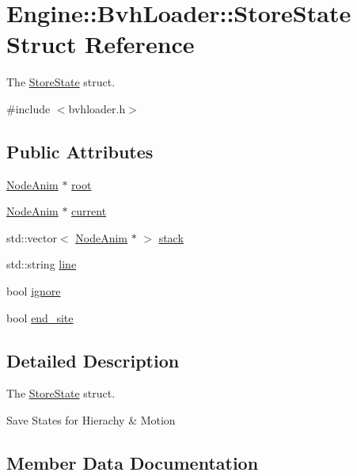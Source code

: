 \hypertarget{structEngine_1_1BvhLoader_1_1StoreState}{}\section{Engine\+:\+:Bvh\+Loader\+:\+:Store\+State Struct Reference}
\label{structEngine_1_1BvhLoader_1_1StoreState}


The \hyperlink{structEngine_1_1BvhLoader_1_1StoreState}{Store\+State} struct.  




{\ttfamily \#include $<$bvhloader.\+h$>$}

\subsection*{Public Attributes}
\begin{DoxyCompactItemize}
\item 
\hyperlink{classEngine_1_1NodeAnim}{Node\+Anim} $\ast$ \hyperlink{structEngine_1_1BvhLoader_1_1StoreState_ac01f720a48885dc6e03901b9765b2db2}{root}
\item 
\hyperlink{classEngine_1_1NodeAnim}{Node\+Anim} $\ast$ \hyperlink{structEngine_1_1BvhLoader_1_1StoreState_ad83062579f793a9de2dcb408bbd9546b}{current}
\item 
std\+::vector$<$ \hyperlink{classEngine_1_1NodeAnim}{Node\+Anim} $\ast$ $>$ \hyperlink{structEngine_1_1BvhLoader_1_1StoreState_a778ff6ec18f3ccb194bdbd0a8342d3f6}{stack}
\item 
std\+::string \hyperlink{structEngine_1_1BvhLoader_1_1StoreState_acaeea33c2fb2172627c6fb2aef5acc79}{line}
\item 
bool \hyperlink{structEngine_1_1BvhLoader_1_1StoreState_a67e2ab4804024f0200dfbb335cb33d78}{ignore}
\item 
bool \hyperlink{structEngine_1_1BvhLoader_1_1StoreState_a9c8556dfae21548e31f532976c6e8ce3}{end\+\_\+site}
\end{DoxyCompactItemize}


\subsection{Detailed Description}
The \hyperlink{structEngine_1_1BvhLoader_1_1StoreState}{Store\+State} struct. 

Save States for Hierachy \& Motion 

\subsection{Member Data Documentation}
\hypertarget{structEngine_1_1BvhLoader_1_1StoreState_ad83062579f793a9de2dcb408bbd9546b}{}
